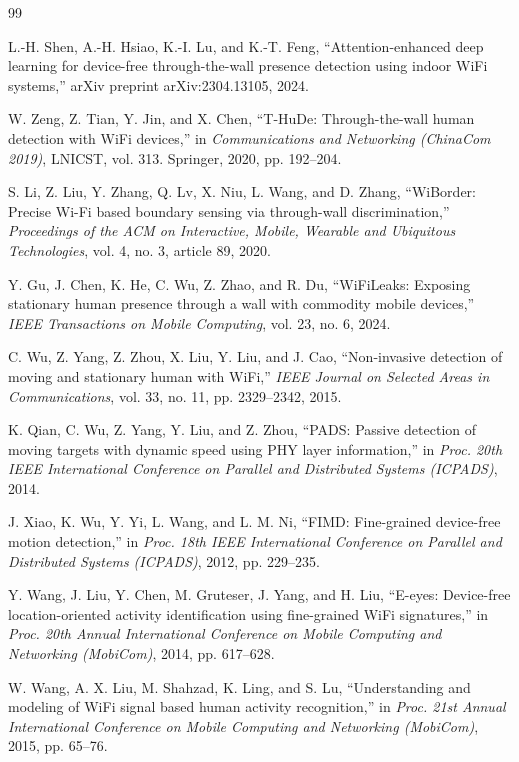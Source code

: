 \documentclass[12pt,a4paper]{report}
\begin{document}
\begin{thebibliography}{99}

 L.-H. Shen, A.-H. Hsiao, K.-I. Lu, and K.-T. Feng, ``Attention-enhanced deep learning for device-free through-the-wall presence detection using indoor WiFi systems,'' arXiv preprint arXiv:2304.13105, 2024.

 W. Zeng, Z. Tian, Y. Jin, and X. Chen, ``T-HuDe: Through-the-wall human detection with WiFi devices,'' in \emph{Communications and Networking (ChinaCom 2019)}, LNICST, vol. 313. Springer, 2020, pp. 192--204.

 S. Li, Z. Liu, Y. Zhang, Q. Lv, X. Niu, L. Wang, and D. Zhang, ``WiBorder: Precise Wi-Fi based boundary sensing via through-wall discrimination,'' \emph{Proceedings of the ACM on Interactive, Mobile, Wearable and Ubiquitous Technologies}, vol. 4, no. 3, article 89, 2020.

 Y. Gu, J. Chen, K. He, C. Wu, Z. Zhao, and R. Du, ``WiFiLeaks: Exposing stationary human presence through a wall with commodity mobile devices,'' \emph{IEEE Transactions on Mobile Computing}, vol. 23, no. 6, 2024.

 C. Wu, Z. Yang, Z. Zhou, X. Liu, Y. Liu, and J. Cao, ``Non-invasive detection of moving and stationary human with WiFi,'' \emph{IEEE Journal on Selected Areas in Communications}, vol. 33, no. 11, pp. 2329--2342, 2015.

 K. Qian, C. Wu, Z. Yang, Y. Liu, and Z. Zhou, ``PADS: Passive detection of moving targets with dynamic speed using PHY layer information,'' in \emph{Proc. 20th IEEE International Conference on Parallel and Distributed Systems (ICPADS)}, 2014.

 J. Xiao, K. Wu, Y. Yi, L. Wang, and L. M. Ni, ``FIMD: Fine-grained device-free motion detection,'' in \emph{Proc. 18th IEEE International Conference on Parallel and Distributed Systems (ICPADS)}, 2012, pp. 229--235.

 Y. Wang, J. Liu, Y. Chen, M. Gruteser, J. Yang, and H. Liu, ``E-eyes: Device-free location-oriented activity identification using fine-grained WiFi signatures,'' in \emph{Proc. 20th Annual International Conference on Mobile Computing and Networking (MobiCom)}, 2014, pp. 617--628.

 W. Wang, A. X. Liu, M. Shahzad, K. Ling, and S. Lu, ``Understanding and modeling of WiFi signal based human activity recognition,'' in \emph{Proc. 21st Annual International Conference on Mobile Computing and Networking (MobiCom)}, 2015, pp. 65--76.


\end{thebibliography}
\end{document}
